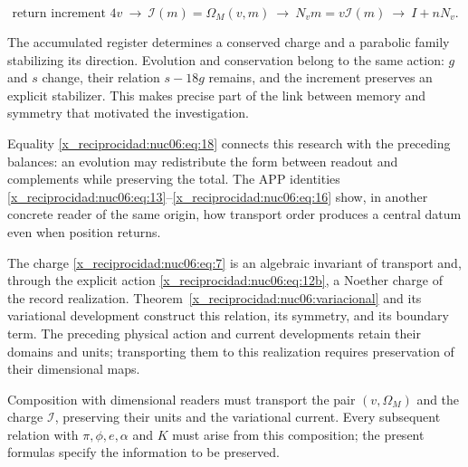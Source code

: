 \begin{equation}
\text{return increment }4v
\ \longrightarrow\ \mathcal I(m)=\Omega_M(v,m)
\ \longrightarrow\ N_vm=v\mathcal I(m)
\ \longrightarrow\ I+nN_v.
\label{x_reciprocidad:nuc06:eq:21}
\end{equation}

The accumulated register determines a conserved charge and a parabolic family stabilizing its direction. Evolution and conservation belong to the same action: \(g\) and \(s\) change, their relation \(s-18g\) remains, and the increment preserves an explicit stabilizer. This makes precise part of the link between memory and symmetry that motivated the investigation.

Equality \eqref{x_reciprocidad:nuc06:eq:18} connects this research with the preceding balances: an evolution may redistribute the form between readout and complements while preserving the total. The APP identities \eqref{x_reciprocidad:nuc06:eq:13}–\eqref{x_reciprocidad:nuc06:eq:16} show, in another concrete reader of the same origin, how transport order produces a central datum even when position returns.

The charge \eqref{x_reciprocidad:nuc06:eq:7} is an algebraic invariant of transport and, through the explicit action \eqref{x_reciprocidad:nuc06:eq:12b}, a Noether charge of the record realization. Theorem~\ref{x_reciprocidad:nuc06:variacional} and its variational development construct this relation, its symmetry, and its boundary term. The preceding physical action and current developments retain their domains and units; transporting them to this realization requires preservation of their dimensional maps.

Composition with dimensional readers must transport the pair \((v,\Omega_M)\) and the charge \(\mathcal I\), preserving their units and the variational current. Every subsequent relation with \(\pi,\phi,e,\alpha\) and \(K\) must arise from this composition; the present formulas specify the information to be preserved.
